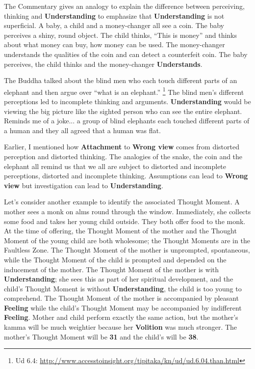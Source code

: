 The Commentary gives an analogy to explain the difference between perceiving, thinking and \textbf{Understanding} to emphasize that \textbf{Understanding} is not superficial. A baby, a child and a money-changer all see a coin. The baby perceives a shiny, round object. The child thinks, “This is money” and thinks about what money can buy, how money can be used. The money-changer understands the qualities of the coin and can detect a counterfeit coin. The baby perceives, the child thinks and the money-changer \textbf{Understands}.

The Buddha talked about the blind men who each touch different parts of an elephant and then argue over “what is an elephant.” \footnote{Ud 6.4: \url{http://www.accesstoinsight.org/tipitaka/kn/ud/ud.6.04.than.html}} The blind men’s different perceptions led to incomplete thinking and arguments. \textbf{Understanding} would be viewing the big picture like the sighted person who can see the entire elephant. Reminds me of a joke... a group of blind elephants each touched different parts of a human and they all agreed that a human was flat.

Earlier, I mentioned how \textbf{Attachment} to \textbf{Wrong view} comes from distorted perception and distorted thinking. The analogies of the snake, the coin and the elephant all remind us that we all are subject to distorted and incomplete perceptions, distorted and incomplete thinking. Assumptions can lead to \textbf{Wrong view} but investigation can lead to \textbf{Understanding}.

Let’s consider another example to identify the associated Thought Moment. A mother sees a monk on alms round through the window. Immediately, she collects some food and takes her young child outside. They both offer food to the monk. At the time of offering, the Thought Moment of the mother and the Thought Moment of the young child are both wholesome; the Thought Moments are in the Faultless Zone. The Thought Moment of the mother is unprompted, spontaneous, while the Thought Moment of the child is prompted and depended on the inducement of the mother. The Thought Moment of the mother is with \textbf{Understanding}; she sees this as part of her spiritual development, and the child’s Thought Moment is without \textbf{Understanding}, the child is too young to comprehend. The Thought Moment of the mother is accompanied by pleasant \textbf{Feeling} while the child’s Thought Moment may be accompanied by indifferent \textbf{Feeling}. Mother and child perform exactly the same action, but the mother’s kamma will be much weightier because her \textbf{Volition} was much stronger. The mother’s Thought Moment will be \textbf{31} and the child’s will be \textbf{38}.

